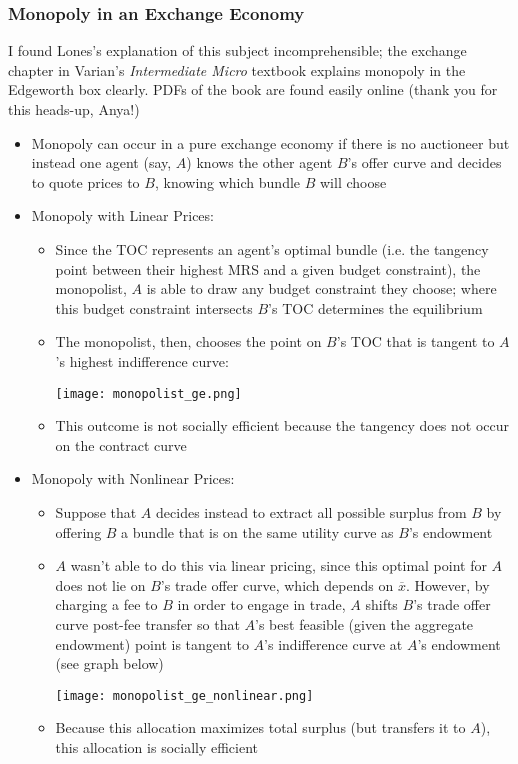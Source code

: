 \documentclass{article}
\newcommand{\olx}{\overline{x}}
\newcommand{\red}[1]{{\color{red}#1}}
\newcommand{\blue}[1]{{\color{blue}#1}}
\begin{document}
\subsubsection{Monopoly in an Exchange Economy}
\red{I found Lones's explanation of this subject incomprehensible; the exchange chapter in Varian's \textit{Intermediate Micro} textbook explains monopoly in the Edgeworth box clearly. PDFs of the book are found easily online (thank you for this heads-up, Anya!)}
\begin{itemize}
	\item Monopoly can occur in a pure exchange economy if there is no auctioneer but instead one agent (say, $A$) knows the other agent $B$'s offer curve and decides to quote prices to $B$, knowing which bundle $B$ will choose 
	\item \blue{Monopoly with Linear Prices:} 
		\begin{itemize}
			\item Since the TOC represents an agent's optimal bundle (i.e. the tangency point between their highest MRS and a given budget constraint), the monopolist, $A$ is able to draw any budget constraint they choose; where this budget constraint intersects $B$'s TOC determines the equilibrium
			\item The monopolist, then, chooses the point on $B$'s TOC that is tangent to $A$'s highest indifference curve:
				\begin{center}
					\texttt{[image: monopolist\_ge.png]}
				\end{center}
			\item This outcome is not socially efficient because the tangency does not occur on the contract curve
		\end{itemize}
	\item \blue{Monopoly with Nonlinear Prices:}
		\begin{itemize}
			\item Suppose that $A$ decides instead to extract all possible surplus from $B$ by offering $B$ a bundle that is on the same utility curve as $B$'s endowment
			\item $A$ wasn't able to do this via linear pricing, since this optimal point for $A$ does not lie on $B$'s trade offer curve, which depends on $\olx$. However, by charging a fee to $B$ in order to engage in trade, $A$ shifts $B$'s trade offer curve post-fee transfer so that $A$'s best feasible (given the aggregate endowment) point is tangent to $A$'s indifference curve at $A$'s endowment (see graph below)
				\begin{center}
					\texttt{[image: monopolist\_ge\_nonlinear.png]}
				\end{center}
				
			\item Because this allocation maximizes total surplus (but transfers it to $A$), this allocation is socially efficient
		\end{itemize}
\end{itemize}
\end{document}
